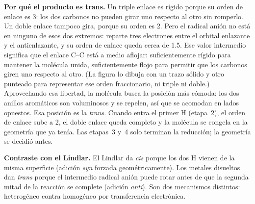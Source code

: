 \textbf{Por qué el producto es trans.}
Un triple enlace es rígido porque su orden de enlace es 3: los dos
carbonos no pueden girar uno respecto al otro sin romperlo. Un doble
enlace tampoco gira, porque su orden es 2. Pero el radical anión no está
en ninguno de esos dos extremos: reparte tres electrones entre el orbital
enlazante y el antienlazante, y su orden de enlace queda cerca de 1.5.
Ese valor intermedio significa que el enlace C--C está a medio aflojar:
suficientemente rígido para mantener la molécula unida, suficientemente
flojo para permitir que los carbonos giren uno respecto al otro.
(La figura lo dibuja con un trazo sólido y otro punteado para representar
ese orden fraccionario, ni triple ni doble.) Aprovechando esa libertad,
la molécula busca la posición más cómoda: los dos anillos aromáticos son
voluminosos y se repelen, así que se acomodan en lados opuestos. Esa
posición es la \textit{trans}. Cuando entra el primer H (etapa~2), el
orden de enlace sube a 2, el doble enlace queda completo y la molécula se
congela en la geometría que ya tenía. Las etapas~3 y~4 solo terminan la
reducción; la geometría se decidió antes.

\textbf{Contraste con el Lindlar.}
El Lindlar da \textit{cis} porque los dos H vienen de la misma superficie
(adición \textit{syn} forzada geométricamente). Los metales disueltos dan
\textit{trans} porque el intermedio radical anión puede rotar antes de
que la segunda mitad de la reacción se complete (adición \textit{anti}).
Son dos mecanismos distintos: heterogéneo contra homogéneo por
transferencia electrónica.